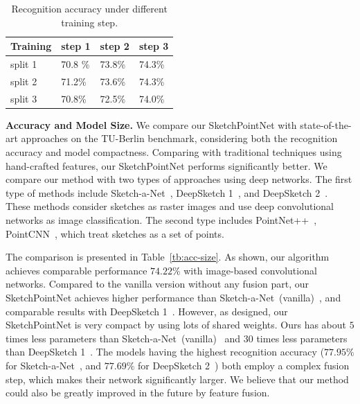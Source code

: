 \begin{table}[htbp]
\centering
\caption{Recognition accuracy under different training step.}
\label{tbl:iteration}
\begin{tabular}{l|lll}
    \hline
     Training& step 1&  step 2& step 3\\
    \hline
     split 1& 70.8 \% & 73.8\% & 74.3\% \\
     split 2& 71.2\% & 73.6\% & 74.3\% \\
     split 3& 70.8\% & 72.5\% & 74.0\% \\
    \hline
\end{tabular}
\end{table}



\noindent\textbf{Accuracy and Model Size.}
%
We compare our SketchPointNet with state-of-the-art approaches on the TU-Berlin benchmark, considering both the recognition accuracy and model compactness.
%
Comparing with traditional techniques using hand-crafted features, our SketchPointNet performs significantly better.
%
We compare our method with two types of approaches using deep networks.
The first type of methods include Sketch-a-Net~\cite{Yu2015SketchaNetTB}, DeepSketch 1~\cite{Seddati2015DeepSketchDC}, and DeepSketch 2~\cite{Dupont2016DeepSketch2D}.
These methods consider sketches as raster images and use deep convolutional networks as image classification.
The second type includes PointNet++~\cite{qi2017pointnetplusplus}, PointCNN~\cite{1801.07791}, which treat sketches as a set of points.


The comparison is presented in Table~\ref{tb:acc-size}.
As shown, our algorithm achieves comparable performance $74.22\%$ with image-based convolutional networks.
%
Compared to the vanilla version without any fusion part, our SketchPointNet achieves higher performance than Sketch-a-Net~(vanilla)~\cite{Yu2015SketchaNetTB}, and comparable results with DeepSketch 1~\cite{Seddati2015DeepSketchDC}.
However, as designed, our SketchPointNet is very compact by using lots of shared weights.
Ours has about $5$ times less parameters than Sketch-a-Net~(vanilla)~\cite{Yu2015SketchaNetTB} and $30$ times less parameters than DeepSketch 1~\cite{Seddati2015DeepSketchDC}.
%
The models having the highest recognition accuracy ($77.95\%$ for Sketch-a-Net~\cite{Yu2015SketchaNetTB}, and $77.69\%$ for DeepSketch 2~\cite{Dupont2016DeepSketch2D}) both employ a complex fusion step, which makes their network significantly larger.
%
We believe that our method could also be greatly improved in the future by feature fusion.


